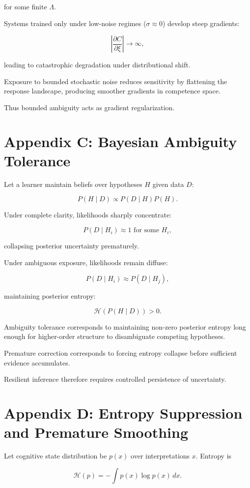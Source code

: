 \documentclass[12pt]{article}
\begin{document}
for some finite $\Lambda$.

Systems trained only under low-noise regimes ($\sigma \approx 0$)
develop steep gradients:

\[
\left| \frac{\partial C}{\partial \xi} \right| \to \infty,
\]

leading to catastrophic degradation under distributional shift.

Exposure to bounded stochastic noise reduces sensitivity by flattening the response landscape,
producing smoother gradients in competence space.

Thus bounded ambiguity acts as gradient regularization.


\section*{Appendix C: Bayesian Ambiguity Tolerance}

Let a learner maintain beliefs over hypotheses $H$ given data $D$:

\[
P(H \mid D) \propto P(D \mid H) P(H).
\]

Under complete clarity, likelihoods sharply concentrate:

\[
P(D \mid H_i) \approx 1 \text{ for some } H_i,
\]

collapsing posterior uncertainty prematurely.

Under ambiguous exposure, likelihoods remain diffuse:

\[
P(D \mid H_i) \approx P(D \mid H_j),
\]

maintaining posterior entropy:

\[
\mathcal{H}(P(H \mid D)) > 0.
\]

Ambiguity tolerance corresponds to maintaining non-zero posterior entropy
long enough for higher-order structure to disambiguate competing hypotheses.

Premature correction corresponds to forcing entropy collapse
before sufficient evidence accumulates.

Resilient inference therefore requires controlled persistence of uncertainty.


\section*{Appendix D: Entropy Suppression and Premature Smoothing}

Let cognitive state distribution be $p(x)$ over interpretations $x$.
Entropy is

\[
\mathcal{H}(p) = - \int p(x) \log p(x)\,dx.
\]
\end{document}
